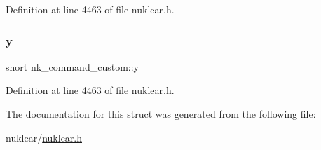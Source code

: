 Definition at line 4463 of file nuklear.\+h.

\mbox{\label{structnk__command__custom_a11a17cf05108285041473a0b44c81154}} 
\subsubsection{\texorpdfstring{y}{y}}
{\footnotesize\ttfamily short nk\+\_\+command\+\_\+custom\+::y}



Definition at line 4463 of file nuklear.\+h.



The documentation for this struct was generated from the following file\+:\begin{DoxyCompactItemize}
\item 
nuklear/\mbox{\hyperlink{nuklear_8h}{nuklear.\+h}}\end{DoxyCompactItemize}
